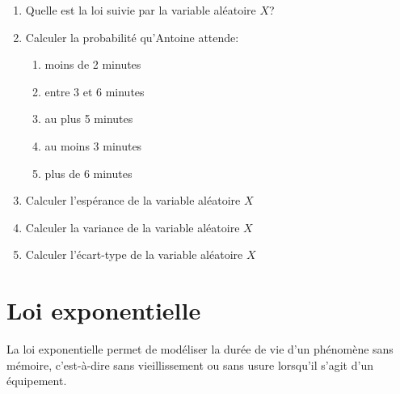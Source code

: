 \documentclass[a4paper,12pt,openany]{book}
\begin{document}
\begin{enumerate}
	\item Quelle est la loi suivie par la variable aléatoire $X$?
	
	\vspace{1cm}
	
	\item Calculer la probabilité qu'Antoine attende:
	
	\begin{enumerate}
		\item moins de 2 minutes \dotfill \\
		\item entre 3 et 6 minutes \dotfill \\
		\item au plus 5 minutes \dotfill\\
		\item au moins 3 minutes \dotfill\\
		\item plus de 6 minutes \dotfill\\
	\end{enumerate}
	
	\item Calculer l'espérance de la variable aléatoire $X$ \dotfill\\
	
	\item Calculer la variance de la variable aléatoire $X$ \dotfill\\
	
	\item Calculer l'écart-type de la variable aléatoire $X$ \dotfill\\
\end{enumerate}


\newpage

\section{Loi exponentielle}

La loi exponentielle permet de modéliser la durée de vie d'un phénomène sans mémoire, c'est-à-dire sans vieillissement ou sans usure lorsqu'il s'agit d'un équipement.
\end{document}
